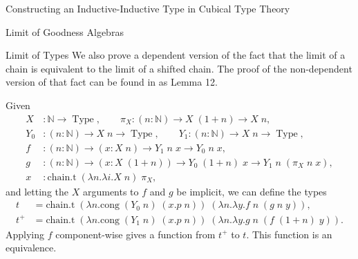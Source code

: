 \documentclass[runningheads]{llncs}
\newcommand{\erase}[1]{{}}
\DeclareMathOperator{\USet}{Type}
\DeclareMathOperator{\Ix}{Ix}
\newcommand{\N}{\mathbb{N}}
\newcommand{\bbO}{\mathbb{O}}
\newcommand{\join}{\texttt{ext}}
\newcommand{\inj}{\texttt{inj}}
\begin{document}
\begin{section}{Constructing an Inductive-Inductive Type in Cubical Type Theory}
\begin{subsection}{Limit of Goodness Algebras}
\begin{subsubsection}{Limit of Types}
    We also prove a dependent version of the fact that the limit of a chain is equivalent to the limit of a shifted chain. The proof of the non-dependent version of that fact can be found in \citet{nonwellfoundedtrees} as Lemma 12.
    
    \begin{lemma}
        Given \begin{align*}
        X &: \N \to \USet,\qquad
        \pi_X : (n : \N) \to X\;(1+n) \to X\;n,\\
        Y_0 &: (n : \N) \to X\;n \to \USet,\qquad
        Y_1 : (n : \N) \to X\;n \to \USet,\\
        f &: (n : \N) \to (x : X\;n) \to Y_1\;n\;x \to Y_0\;n\;x,\\
        g &: (n : \N) \to (x : X\;(1+n)) \to Y_0\;(1+n)\;x \to Y_1\;n\;(\pi_X\;n\;x),\\
        x &: \text{chain.t}\;(\lambda n.\lambda i.X\;n)\;\pi_X,
        \end{align*}
        and letting the $X$ arguments to $f$ and $g$ be implicit,
        we can define the types \begin{align*}t &= \text{chain.t}\;(\lambda n.\text{cong}\;(Y_0\;n)\;(x.p\;n))\;(\lambda n.\lambda y.f\;n\;(g\;n\;y)),\\t^+ &= \text{chain.t}\;(\lambda n.\text{cong}\;(Y_1\;n)\;(x.p\;n))\;(\lambda n.\lambda y.g\;n\;(f\;(1+n)\;y)).\end{align*}
        Applying $f$ component-wise gives a function from $t^+$ to $t$.
        This function is an equivalence.
    \end{lemma}
    
\end{subsubsection}


\erase{
We will proceed clause by clause, through $(L.A, L.B, L.\eta, L.\join, L.\inj)$.

\begin{subsubsection}{Defining $L.A$}
First, we define \[\Ix_\simeq.A : \Ix A\; L \simeq \text{chain.t}\;(\lambda n.\lambda i.\Ix A\;(S^n\;\bbO))\;(\lambda n.(\delta^\pi\;(S^n\;\bbO)).A)\] witnessing that $\Ix A$ commutes with chains by using Lemma \ref{limit-const-commute} with $\top$, since $\Ix A\;\delta^G = \top$ independent of $\delta^G$, and $(\delta^\pi\;(S^n\;\bbO)).A$ is the identity function.


\end{subsubsection}}
\end{subsection}
\end{section}
\end{document}
